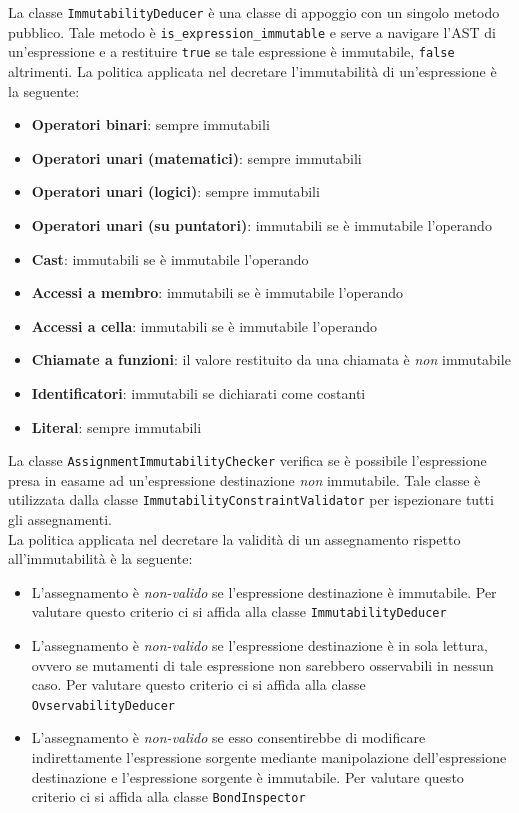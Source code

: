 \newpage

La classe \texttt{ImmutabilityDeducer} è una classe di appoggio con un singolo metodo pubblico. Tale metodo è 
\texttt{is\_expression\_immutable} e serve a navigare l'AST di un'espressione e a restituire \texttt{true} se
tale espressione è immutabile, \texttt{false} altrimenti. La politica applicata nel decretare l'immutabilità
di un'espressione è la seguente:

\begin{itemize}
    \item \textbf{Operatori binari}: sempre immutabili
    \item \textbf{Operatori unari (matematici)}: sempre immutabili
    \item \textbf{Operatori unari (logici)}: sempre immutabili
    \item \textbf{Operatori unari (su puntatori)}: immutabili se è immutabile l'operando
    \item \textbf{Cast}: immutabili se è immutabile l'operando
    \item \textbf{Accessi a membro}: immutabili se è immutabile l'operando
    \item \textbf{Accessi a cella}: immutabili se è immutabile l'operando
    \item \textbf{Chiamate a funzioni}: il valore restituito da una chiamata è \textit{non} immutabile
    \item \textbf{Identificatori}: immutabili se dichiarati come costanti
    \item \textbf{Literal}: sempre immutabili
\end{itemize}

La classe \texttt{AssignmentImmutabilityChecker} verifica se è possibile l'espressione presa in easame 
ad un'espressione destinazione \textit{non} immutabile. Tale classe è utilizzata dalla classe 
\texttt{ImmutabilityConstraintValidator} per ispezionare tutti gli assegnamenti. \\

La politica applicata nel decretare la validità di un assegnamento rispetto all'immutabilità è la seguente:

\begin{itemize}
    \item L'assegnamento è \textit{non-valido} se l'espressione destinazione è immutabile. Per 
    valutare questo criterio ci si affida alla classe \texttt{ImmutabilityDeducer}
    \item L'assegnamento è \textit{non-valido} se l'espressione destinazione è in sola lettura,
    ovvero se mutamenti di tale espressione non sarebbero osservabili in nessun caso. Per valutare
    questo criterio ci si affida alla classe \texttt{OvservabilityDeducer}
    \item L'assegnamento è \textit{non-valido} se esso consentirebbe di modificare indirettamente 
    l'espressione sorgente mediante manipolazione dell'espressione destinazione e l'espressione sorgente 
    è immutabile. Per valutare questo criterio ci si affida alla classe \texttt{BondInspector}
\end{itemize}

